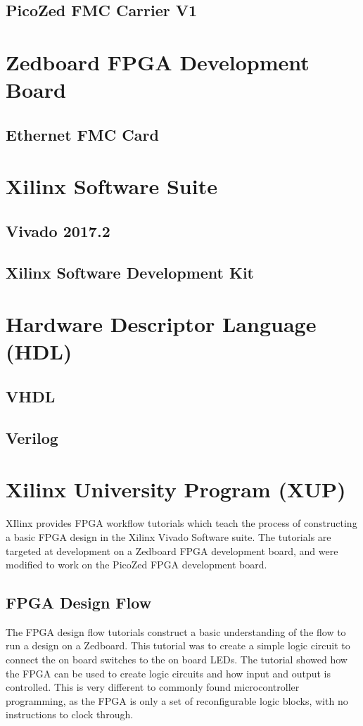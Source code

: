 \subsection{PicoZed FMC Carrier V1}
\section{Zedboard FPGA Development Board}
\subsection{Ethernet FMC Card}
\section{Xilinx Software Suite}
\subsection{Vivado 2017.2}
\subsection{Xilinx Software Development Kit}
\section{Hardware Descriptor Language (HDL)}
\subsection{VHDL}
\subsection{Verilog}
\section{Xilinx University Program (XUP)}

\par XIlinx provides FPGA workflow tutorials which teach the process of constructing a basic FPGA design in the 
Xilinx Vivado Software suite. The tutorials are targeted at development on a Zedboard FPGA development board, and were
modified to work on the PicoZed FPGA development board.

\subsection{FPGA Design Flow}

\par The FPGA design flow tutorials construct a basic understanding of the flow to run a design on a Zedboard. 
This tutorial was to create a simple logic circuit to connect the on board switches to the on board LEDs. 
The tutorial showed how the FPGA can be used to create logic circuits and how input and output is controlled.
This is very different to commonly found microcontroller programming, as the FPGA is only a set of reconfigurable
logic blocks, with no instructions to clock through.

